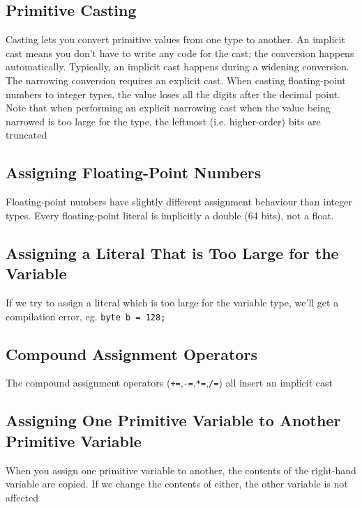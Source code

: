 \subsection{Primitive Casting}
Casting lets you convert primitive values from one type to another. An implicit 
cast means you don't have to write any code for the cast; the conversion 
happens automatically. Typically, an implicit cast happens during a widening 
conversion. The narrowing conversion requires an explicit cast. When casting 
floating-point numbers to integer types, the value loses all the digits after 
the decimal point. Note that when performing an explicit narrowing cast when 
the value being narrowed is too large for the type, the leftmost (i.e.  
higher-order) bits are truncated

\subsection{Assigning Floating-Point Numbers}
Floating-point numbers have slightly different assignment behaviour than 
integer types. Every floating-point literal is implicitly a double (64 bits), 
not a float.

\subsection{Assigning a Literal That is Too Large for the Variable}
If we try to assign a literal which is too large for the variable type, we'll 
get a compilation error, eg. \verb#byte b = 128;#

\subsection{Compound Assignment Operators}
The compound assignment operators (\verb#+=#,\verb#-=#,\verb#*=#,\verb#/=#) all 
insert an implicit cast

\subsection{Assigning One Primitive Variable to Another Primitive Variable}
When you assign one primitive variable to another, the contents of the 
right-hand variable are copied. If we change the contents of either, the other 
variable is not affected

